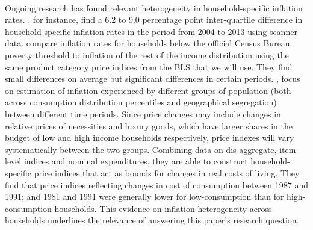 \documentclass{article}
\begin{document}
\\
Ongoing research has found relevant heterogeneity in household-specific inflation rates. \cite{Kaplan2017InflationLevel}, for instance, find a 6.2 to 9.0 percentage point inter-quartile difference in household-specific inflation rates in the period from  2004 to 2013 using scanner data. \cite{Hobijn2005INFLATIONSTATES} compare inflation rates for households below the official Census Bureau poverty threshold  to inflation of the rest of the income distribution using the same product category price indices from the BLS that we will use. They find small differences on average but significant differences in certain periods. %
\cite{Cage2002ConstructingMethods}, focus on estimation of inflation experienced by different groups of population (both across consumption distribution percentiles and geographical segregation) between different time periods.
Since price changes may include changes in relative prices of necessities and luxury goods, which have larger shares in the budget of low and high income households respectively, price indexes will vary systematically between the two groups. Combining data on dis-aggregate, item-level indices and nominal expenditures, they are able to construct household-specific price indices that act as bounds for changes in real costs of living. They find that price indices reflecting changes in cost of consumption between 1987 and 1991; and 1981 and 1991 were generally lower for low-consumption than for high-consumption households.%
This evidence on inflation heterogeneity across households underlines the relevance of answering this paper's research question.
\\
\end{document}

